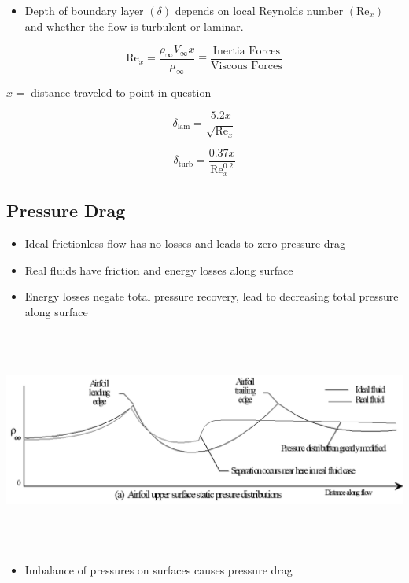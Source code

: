 \documentclass[
]{book}
\providecommand{\tightlist}{%
  \setlength{\itemsep}{0pt}\setlength{\parskip}{0pt}}
\begin{document}
\begin{itemize}
\tightlist
\item
  Depth of boundary layer \((\delta)\) depends on local Reynolds number \((\mathrm{Re}_x)\) and whether the flow is turbulent or laminar.
\end{itemize}

\[\mathrm{Re}_x = \frac{\rho_{\infty} V_{\infty} x}{\mu_{\infty}} \equiv \frac{\text{Inertia Forces}}{\text{Viscous Forces}} \]

\(x =\) distance traveled to point in question

\[\delta_{\mathrm{lam}} = \frac{5.2x}{\sqrt{\mathrm{Re}_x}} \]

\[\delta_{\mathrm{turb}} = \frac{0.37x}{\mathrm{Re}_x^{0.2}} \]

\hypertarget{pressure-drag}{%
\subsection{Pressure Drag}\label{pressure-drag}}

\begin{itemize}
\tightlist
\item
  Ideal frictionless flow has no losses and leads to zero pressure drag
\item
  Real fluids have friction and energy losses along surface
\item
  Energy losses negate total pressure recovery, lead to decreasing total pressure along surface
\end{itemize}

\includegraphics[width=8.8in,height=2.875in]{media/05/image46.png}

\begin{itemize}
\tightlist
\item
  Imbalance of pressures on surfaces causes pressure drag
\end{itemize}
\end{document}
